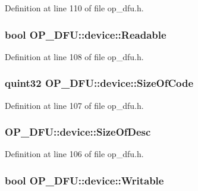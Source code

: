Definition at line 110 of file op\-\_\-dfu.\-h.

\hypertarget{struct_o_p___d_f_u_1_1device_a0640f3f5608690d8bb93087ba8c15e86}{
\subsubsection[{Readable}]{\setlength{\rightskip}{0pt plus 5cm}bool O\-P\-\_\-\-D\-F\-U\-::device\-::\-Readable}}\label{struct_o_p___d_f_u_1_1device_a0640f3f5608690d8bb93087ba8c15e86}


Definition at line 108 of file op\-\_\-dfu.\-h.

\hypertarget{struct_o_p___d_f_u_1_1device_a02ce2352ca3f52e77ef7073f1fd0afeb}{
\subsubsection[{Size\-Of\-Code}]{\setlength{\rightskip}{0pt plus 5cm}quint32 O\-P\-\_\-\-D\-F\-U\-::device\-::\-Size\-Of\-Code}}\label{struct_o_p___d_f_u_1_1device_a02ce2352ca3f52e77ef7073f1fd0afeb}


Definition at line 107 of file op\-\_\-dfu.\-h.

\hypertarget{struct_o_p___d_f_u_1_1device_af5032c18eb9777d1537ae89d28426567}{
\subsubsection[{Size\-Of\-Desc}]{ O\-P\-\_\-\-D\-F\-U\-::device\-::\-Size\-Of\-Desc}}\label{struct_o_p___d_f_u_1_1device_af5032c18eb9777d1537ae89d28426567}


Definition at line 106 of file op\-\_\-dfu.\-h.

\hypertarget{struct_o_p___d_f_u_1_1device_adf6e576700c6b3bb81fab16a4627d476}{
\subsubsection[{Writable}]{\setlength{\rightskip}{0pt plus 5cm}bool O\-P\-\_\-\-D\-F\-U\-::device\-::\-Writable}}\label{struct_o_p___d_f_u_1_1device_adf6e576700c6b3bb81fab16a4627d476}


